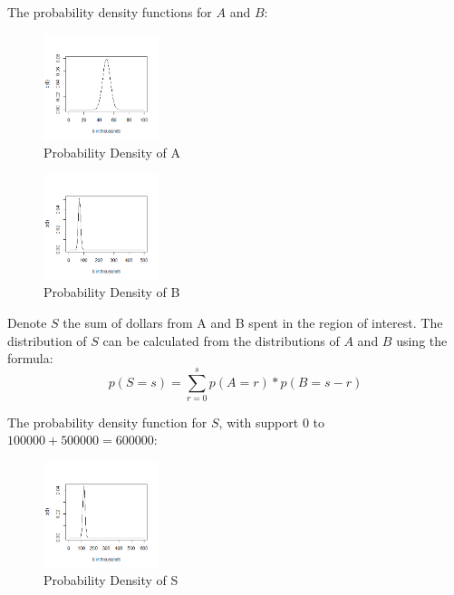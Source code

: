 \documentclass[12pt]{article}
\begin{document}
\noindent The probability density functions for $A$ and $B$:

\begin{figure}[!hbt]
\centering
\includegraphics[width=0.3\textwidth]{dist_a.png}
\caption{\label{fig:dist_a}Probability Density of A}
\end{figure}

\begin{figure}[!hbt]
\centering
\includegraphics[width=0.3\textwidth]{dist_b.png}
\caption{\label{fig:dist_b}Probability Density of B}
\end{figure}

\break

\noindent Denote $S$ the sum of dollars from A and B spent in the region of interest. The distribution of $S$ can be calculated from the distributions of $A$ and $B$ using the formula\cite{butler1993distribution}: 
\begin{equation}
p(S = s) = \sum_{r=0}^{s}p(A=r) * p(B = s-r)
\end{equation}

\noindent The probability density function for $S$, with support $0$ to $100000+500000=600000$:

\begin{figure}[!hbt]
\centering
\includegraphics[width=0.3\textwidth]{dist_s.png}
\caption{\label{fig:dist_s}Probability Density of S}
\end{figure}
\end{document}
